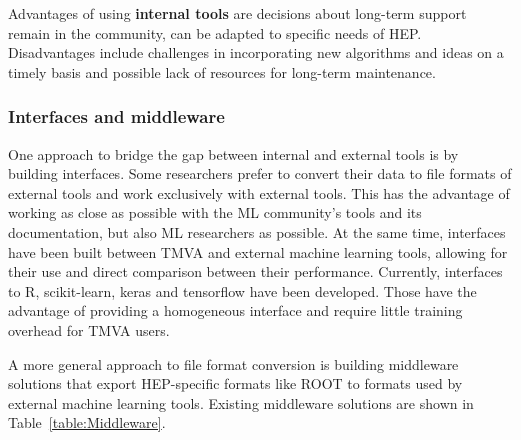 Advantages of using {\bf internal tools} are decisions about long-term support remain in the community, can be adapted to specific needs of HEP. Disadvantages include challenges in incorporating new algorithms and ideas on a timely basis and possible lack of resources for long-term maintenance.

\subsubsection{Interfaces and middleware}

One approach to bridge the gap between internal and external tools is by building interfaces. Some researchers prefer to convert their data to file formats of external tools and work exclusively with external tools. This has the advantage of working as close as possible with the ML community's tools and its documentation, but also ML researchers as possible.
At the same time, interfaces have been built between TMVA and external machine learning tools, allowing for their use and direct comparison between their performance. Currently, interfaces to R, scikit-learn, keras and tensorflow have been developed. Those have the advantage of providing a homogeneous interface and require little training overhead for TMVA users.

A more general approach to file format conversion is building middleware solutions that export HEP-specific formats like ROOT to formats used by external machine learning tools.
Existing middleware solutions are shown in Table~\ref{table:Middleware}.

